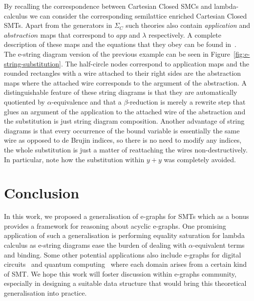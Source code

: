 \documentclass[sigconf, 9pt, nonacm]{acmart}
\theoremstyle{definition}
\begin{document}
By recalling the correspondence between Cartesian Closed SMCs and lambda-calculus we can consider the corresponding semilattice enriched Cartesian Closed SMTs.
Apart from the generators in $\Sigma_{C}$ such theories also contain \textit{application} and $\textit{abstraction}$ maps that correspond to $app$ and $\lambda$ respectively.
A complete description of these maps and the equations that they obey can be found in~\cite{ghica-zanassi2023string}.
The e-string diagram version of the previous example can be seen in Figure~\ref{fig:e-string-substitution}.
The half-circle nodes correspond to application maps and the rounded rectangles with a wire attached to their right sides are the abstraction maps where the attached wire corresponds to the argument of the abstraction.
A distinguishable feature of these string diagrams is that they are automatically quotiented by $\alpha$-equivalence and that a $\beta$-reduction is merely a rewrite step that glues an argument of the application to the attached wire of the abstraction and the substitution is just string diagram composition.
Another advantage of string diagrams is that every occurrence of the bound variable is essentially the same wire as opposed to de Brujin indices, so there is no need to modify any indices, the whole substitution is just a matter of reattaching the wires non-destructively.
In particular, note how the substitution within $y + y$ was completely avoided.

\section{Conclusion}

In this work, we proposed a generalisation of e-graphs for SMTs which as a bonus provides a framework for reasoning about acyclic e-graphs.
One promising application of such a generalisation is performing equality saturation for lambda calculus as e-string diagrams ease the burden of dealing with $\alpha$-equivalent terms and binding.
Some other potential applications also include e-graphs for digital circuits~\cite{ghica_compositional_2023} and quantum computing~\cite{coecke_interacting_2011} where each domain arises from a certain kind of SMT.
We hope this work will foster discussion within e-graphs community, especially in designing a suitable data structure that would bring this theoretical generalisation into practice.



\end{document}
